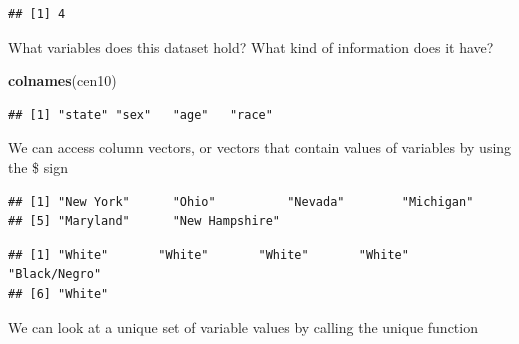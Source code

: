 \documentclass[]{book}
\newenvironment{Shaded}{\begin{snugshade}}{\end{snugshade}}
\newcommand{\KeywordTok}[1]{\textcolor[rgb]{0.13,0.29,0.53}{\textbf{#1}}}
\newcommand{\NormalTok}[1]{#1}
\newcommand{\OperatorTok}[1]{\textcolor[rgb]{0.81,0.36,0.00}{\textbf{#1}}}
\theoremstyle{definition}
\theoremstyle{definition}
\theoremstyle{definition}
\theoremstyle{remark}
\begin{document}
\begin{verbatim}
## [1] 4
\end{verbatim}

What variables does this dataset hold? What kind of information does it have?

\begin{Shaded}
\begin{Highlighting}[]
\KeywordTok{colnames}\NormalTok{(cen10)}
\end{Highlighting}
\end{Shaded}

\begin{verbatim}
## [1] "state" "sex"   "age"   "race"
\end{verbatim}

We can access column vectors, or vectors that contain values of variables by using the \$ sign

\begin{Shaded}
\end{Shaded}

\begin{verbatim}
## [1] "New York"      "Ohio"          "Nevada"        "Michigan"     
## [5] "Maryland"      "New Hampshire"
\end{verbatim}

\begin{Shaded}
\end{Shaded}

\begin{verbatim}
## [1] "White"       "White"       "White"       "White"       "Black/Negro"
## [6] "White"
\end{verbatim}

We can look at a unique set of variable values by calling the unique function

\begin{Shaded}
\end{Shaded}
\end{document}
